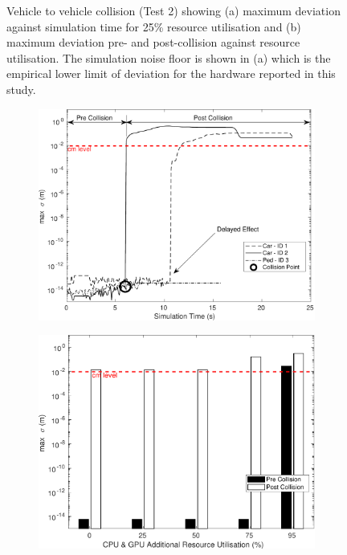 \begin{figure}[t]
\begin{subfigure}{.49\textwidth}
        \caption{}
        \label{CarsCollisionPrePost}
    \end{subfigure}
    \caption{Vehicle to vehicle collision (Test 2) showing (a) maximum deviation against simulation time for 25\% resource utilisation and (b) maximum deviation pre- and post-collision against resource utilisation. The simulation noise floor is shown in (a) which is the empirical lower limit of deviation for the hardware reported in this study.}
\end{figure}

\begin{figure}[h]
    \centering
    \begin{subfigure}{.49\textwidth}
        \includegraphics[width=1\textwidth]{../other/figures/CarsPeopleCollsionsCG25_V3.pdf}
        \caption{}
        \label{CarsPeopleCollsionsCG25}
    \end{subfigure}
    \begin{subfigure}{.49\textwidth}
        \includegraphics[width=1\textwidth]{../other/figures/CarsPeopleCollisionPrePostV5.pdf}

\end{subfigure}
\end{figure}
